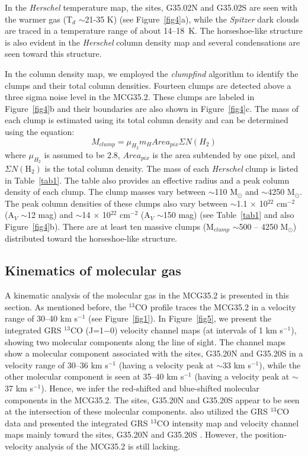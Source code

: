 \documentclass[iop]{emulateapj}
\begin{document}
In the {\it Herschel} temperature map, the sites, G35.02N and G35.02S are seen with 
the warmer gas (T$_{d}$ $\sim$21-35 K) (see Figure~\ref{fig4}a), while the {\it Spitzer} dark clouds are traced in a 
temperature range of about 14--18~K. The horseshoe-like structure is also evident in the {\it Herschel} column density map and 
several condensations are seen toward this structure.

In the column density map, we employed the {\it clumpfind} algorithm to identify the clumps and their total column densities. 
Fourteen clumps are detected above a three sigma noise level in the MCG35.2. 
These clumps are labeled in Figure~\ref{fig4}b and their boundaries are also shown in Figure~\ref{fig4}c.
The mass of each clump is estimated using its total column density and can be determined using the equation:
\begin{equation}
M_{clump} = \mu_{H_2} m_H Area_{pix} \Sigma N(H_2)
\end{equation}
where $\mu_{H_2}$ is assumed to be 2.8, $Area_{pix}$ is the area subtended by one pixel, and 
$\Sigma N(\mathrm H_2)$ is the total column density. 
The mass of each {\it Herschel} clump is listed in Table~\ref{tab1}. 
The table also provides an effective radius and a peak column density of each clump. 
The clump masses vary between $\sim$110 M$_{\odot}$ and $\sim$4250 M$_{\odot}$. 
The peak column densities of these clumps also vary between $\sim$1.1 $\times$ 10$^{22}$ cm$^{-2}$ (A$_{V}$ $\sim$12 mag) and 
$\sim$14 $\times$ 10$^{22}$ cm$^{-2}$ (A$_{V}$ $\sim$150 mag) (see Table~\ref{tab1} and also Figure~\ref{fig4}b). 
There are at least ten massive clumps (M$_{clump}$ $\sim$500 -- 4250 M$_{\odot}$) distributed toward the horseshoe-like structure. 
%
\subsection{Kinematics of molecular gas}
\label{sec:coem} 
%
A kinematic analysis of the molecular gas in the MCG35.2 is presented in this section.
As mentioned before, the $^{13}$CO profile traces the MCG35.2 in a velocity range of 30--40 km s$^{-1}$ (see Figure~\ref{fig1}). 
In Figure~\ref{fig5}, we present the integrated GRS $^{13}$CO (J=1$-$0) velocity channel 
maps (at intervals of 1 km s$^{-1}$), showing two molecular components along the line of sight. 
The channel maps show a molecular component associated with the sites, G35.20N and G35.20S in a velocity range of 30--36 km s$^{-1}$ 
(having a velocity peak at $\sim$33 km s$^{-1}$), while the other molecular component is seen at 35--40 km s$^{-1}$ 
(having a velocity peak at $\sim$37 km s$^{-1}$). Hence, we infer the red-shifted and blue-shifted molecular components in the MCG35.2. 
The sites, G35.20N and G35.20S appear to be seen at the intersection of these molecular components. 
\citet{paron10} also utilized the GRS $^{13}$CO data and presented the integrated GRS $^{13}$CO intensity map and velocity 
channel maps mainly toward the sites, G35.20N and G35.20S \citep[see Figures 3 and 4 in][]{paron10}. 
However, the position-velocity analysis of the MCG35.2 is still lacking. 
\end{document}
